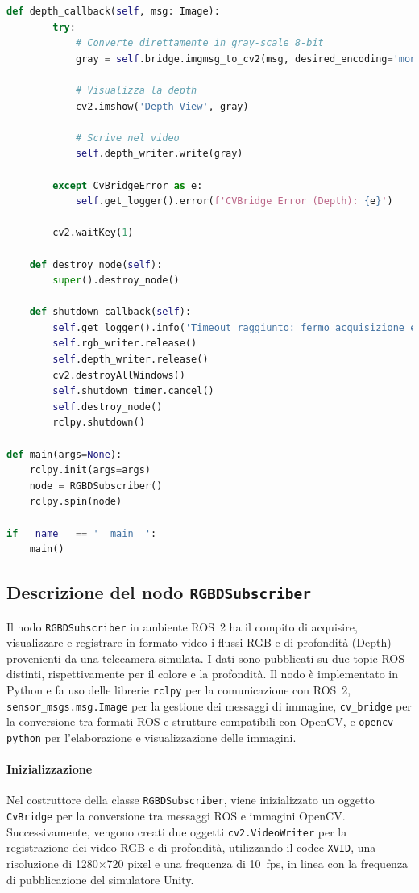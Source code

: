 \documentclass[11pt]{report}
\begin{document}
\begin{lstlisting}[language=Python, caption=Subscriber RGB-D ROS2 con salvataggio video, label=lst:rgbd_subscriber]
    def depth_callback(self, msg: Image):
        try:
            # Converte direttamente in gray-scale 8-bit
            gray = self.bridge.imgmsg_to_cv2(msg, desired_encoding='mono8')

            # Visualizza la depth
            cv2.imshow('Depth View', gray)

            # Scrive nel video
            self.depth_writer.write(gray)

        except CvBridgeError as e:
            self.get_logger().error(f'CVBridge Error (Depth): {e}')

        cv2.waitKey(1)

    def destroy_node(self):
        super().destroy_node()

    def shutdown_callback(self):
        self.get_logger().info('Timeout raggiunto: fermo acquisizione e chiudo finestre.')
        self.rgb_writer.release()
        self.depth_writer.release()
        cv2.destroyAllWindows()
        self.shutdown_timer.cancel()
        self.destroy_node()
        rclpy.shutdown()

def main(args=None):
    rclpy.init(args=args)
    node = RGBDSubscriber()
    rclpy.spin(node)

if __name__ == '__main__':
    main()
\end{lstlisting}
\subsection{Descrizione del nodo \texttt{RGBDSubscriber}}

Il nodo \texttt{RGBDSubscriber} in ambiente ROS~2 ha il compito di acquisire, visualizzare e registrare in formato video i flussi RGB e di profondità (Depth) provenienti da una telecamera simulata. I dati sono pubblicati su due topic ROS distinti, rispettivamente per il colore e la profondità. Il nodo è implementato in Python e fa uso delle librerie \texttt{rclpy} per la comunicazione con ROS~2, \texttt{sensor\_msgs.msg.Image} per la gestione dei messaggi di immagine, \texttt{cv\_bridge} per la conversione tra formati ROS e strutture compatibili con OpenCV, e \texttt{opencv-python} per l’elaborazione e visualizzazione delle immagini.

\paragraph{Inizializzazione}
Nel costruttore della classe \texttt{RGBDSubscriber}, viene inizializzato un oggetto \texttt{CvBridge} per la conversione tra messaggi ROS e immagini OpenCV. Successivamente, vengono creati due oggetti \texttt{cv2.VideoWriter} per la registrazione dei video RGB e di profondità, utilizzando il codec \texttt{XVID}, una risoluzione di 1280$\times$720 pixel e una frequenza di 10~fps, in linea con la frequenza di pubblicazione del simulatore Unity.
\end{document}
